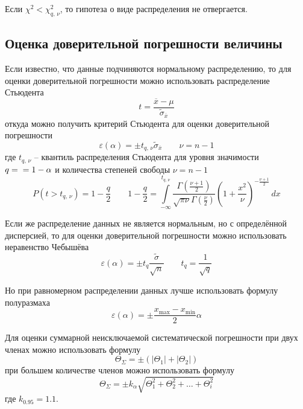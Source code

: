 \documentclass[12pt,a4paper]{article}
\begin{document}
Если $\chi^2 < \chi^2_{q,\,\nu}$, то гипотеза о виде распределения не отвергается.

\subsection{Оценка доверительной погрешности величины}

Если известно, что данные подчиняются нормальному распределению, то для оценки 
доверительной погрешности можно использовать распределение Стьюдента
\begin{equation*}
  t = \frac{\overline{x} - \mu}{\tilde{\sigma}_{\overline{x}}}
\end{equation*}
откуда можно получить критерий Стьюдента для оценки доверительной погрешности
\begin{equation}
  \varepsilon(\alpha) = \pm t_{q,\,\nu}\tilde{\sigma}_{\overline{x}} \qquad \nu = n - 1
  \tag{4.1}
  \label{student:confidence}
\end{equation}
где $t_{q,\,\nu}$ – квантиль распределения Стьюдента для уровня значимости $q = \\ = 1 - \alpha$ и 
количества степеней свободы $\nu = n - 1$
\begin{equation}
  P\left(t > t_{q,\,\nu}\right) = 1 - \frac{q}{2}
  \qquad
  1 - \frac{q}{2} = \int\limits_{-\infty}^{t_{q,\,\nu}}
  \frac{\Gamma(\frac{\nu + 1}{2})}{\sqrt{\pi\nu}\Gamma(\frac{\nu}{2})}
  \left(1 + \frac{x^2}{\nu}\right)^{-\frac{\nu + 1}{2}}\,dx
  \tag{4.2}
  \label{student:critical}
\end{equation}

Если же распределение данных не является нормальным, но с определённой дисперсией, то 
для оценки доверительной погрешности можно использовать неравенство Чебышёва
\begin{equation*}
  \varepsilon(\alpha) = \pm t_{q}\frac{\tilde{\sigma}}{\sqrt{n}} \qquad t_{q} = \frac{1}{\sqrt{q}}
  \tag{4.3}
  \label{chebyshev:confidence}
\end{equation*}

Но при равномерном распределении данных лучше использовать формулу полуразмаха
\begin{equation*}
  \varepsilon(\alpha) = \pm \frac{x_{\max} - x_{\min}}{2}\alpha
\end{equation*}

Для оценки суммарной неисключаемой систематической погрешности при двух членах можно 
использовать формулу
\begin{equation}
  \Theta_\Sigma = \pm\left(\left|\Theta_1\right| + \left|\Theta_2\right|\right)
  \tag{4.4}
\end{equation}
при большем количестве членов можно использовать формулу
\begin{equation}
  \Theta_\Sigma = \pm k_\alpha\sqrt{\Theta_1^2 + \Theta_2^2 + \ldots + \Theta_i^2}
  \tag{4.5}
\end{equation}
где $k_{0.95} = 1.1$.
\end{document}
